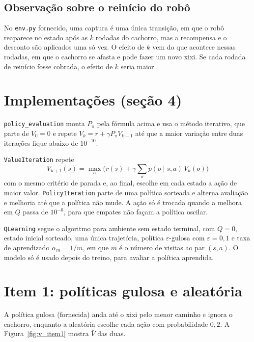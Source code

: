 \documentclass[11pt,a4paper]{article}
\newcommand{\Vbar}{\bar{V}}
\newcommand{\code}[1]{\texttt{#1}}
\begin{document}
\subsection*{Observação sobre o reinício do robô}

No \code{env.py} fornecido, uma captura é uma única transição, em que o robô reaparece no estado após as $k$ rodadas do cachorro, mas a recompensa e o desconto são aplicados uma só vez. O efeito de $k$ vem do que acontece nessas rodadas, em que o cachorro se afasta e pode fazer um novo xixi. Se cada rodada de reinício fosse cobrada, o efeito de $k$ seria maior.

\section{Implementações (seção 4)}

\code{policy\_evaluation} monta $P_\pi$ pela fórmula acima e usa o método iterativo, que parte de $V_0 = 0$ e repete $V_k = r + \gamma P_\pi V_{k-1}$ até que a maior variação entre duas iterações fique abaixo de $10^{-10}$.

\code{ValueIteration} repete
\[
V_{k+1}(s) = \max_a \Big( r(s) + \gamma \sum_o p(o \mid s, a)\, V_k(o) \Big)
\]
com o mesmo critério de parada e, ao final, escolhe em cada estado a ação de maior valor. \code{PolicyIteration} parte de uma política sorteada e alterna avaliação e melhoria até que a política não mude. A ação só é trocada quando a melhora em $Q$ passa de $10^{-6}$, para que empates não façam a política oscilar.

\code{QLearning} segue o algoritmo para ambiente sem estado terminal, com $Q = 0$, estado inicial sorteado, uma única trajetória, política $\varepsilon$-gulosa com $\varepsilon = 0{,}1$ e taxa de aprendizado $\alpha_m = 1/m$, em que $m$ é o número de visitas ao par $(s, a)$. O modelo só é usado depois do treino, para avaliar a política aprendida.

\section{Item 1: políticas gulosa e aleatória}

A política gulosa (fornecida) anda até o xixi pelo menor caminho e ignora o cachorro, enquanto a aleatória escolhe cada ação com probabilidade $0{,}2$. A Figura~\ref{fig:v_item1} mostra $\Vbar$ das duas.
\end{document}
